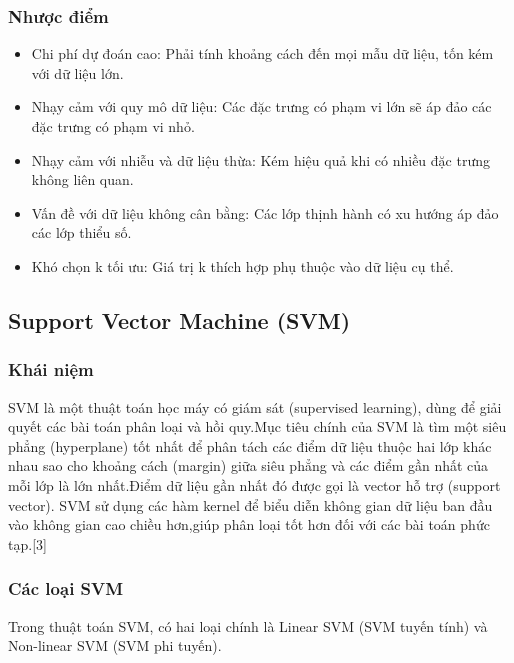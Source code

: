 \documentclass[
]{article}
\begin{document}
\subsubsection{Nhược điểm}\label{nhux1b0ux1ee3c-ux111iux1ec3m}

\begin{itemize}
\item
  Chi phí dự đoán cao: Phải tính khoảng cách đến mọi mẫu dữ liệu, tốn
  kém với dữ liệu lớn.
\item
  Nhạy cảm với quy mô dữ liệu: Các đặc trưng có phạm vi lớn sẽ áp đảo
  các đặc trưng có phạm vi nhỏ.
\item
  Nhạy cảm với nhiễu và dữ liệu thừa: Kém hiệu quả khi có nhiều đặc
  trưng không liên quan.
\item
  Vấn đề với dữ liệu không cân bằng: Các lớp thịnh hành có xu hướng áp
  đảo các lớp thiểu số.
\item
  Khó chọn k tối ưu: Giá trị k thích hợp phụ thuộc vào dữ liệu cụ thể.
\end{itemize}

\subsection{Support Vector Machine
(SVM)}\label{support-vector-machine-svm}

\subsubsection{Khái niệm}\label{khuxe1i-niux1ec7m-2}

SVM là một thuật toán học máy có giám sát (supervised learning), dùng để
giải quyết các bài toán phân loại và hồi quy.Mục tiêu chính của SVM là
tìm một siêu phẳng (hyperplane) tốt nhất để phân tách các điểm dữ liệu
thuộc hai lớp khác nhau sao cho khoảng cách (margin) giữa siêu phẳng và
các điểm gần nhất của mỗi lớp là lớn nhất.Điểm dữ liệu gần nhất đó được
gọi là vector hỗ trợ (support vector). SVM sử dụng các hàm kernel để
biểu diễn không gian dữ liệu ban đầu vào không gian cao chiều hơn,giúp
phân loại tốt hơn đối với các bài toán phức tạp.{[}3{]}

\subsubsection{Các loại SVM}\label{cuxe1c-loux1ea1i-svm}

Trong thuật toán SVM, có hai loại chính là Linear SVM (SVM tuyến tính)
và Non-linear SVM (SVM phi tuyến).
\end{document}
